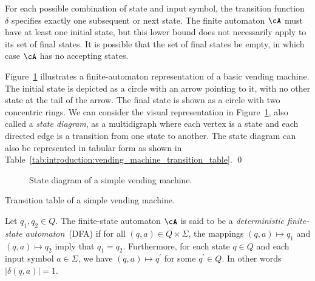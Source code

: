 For each possible combination of state and input symbol, the
transition function $\delta$ specifies exactly one subsequent or next
state. The finite automaton $\cA$ must have at least one initial
state, but this lower bound does not necessarily apply to its set of
final states. It is possible that the set of final states be empty, in
which case $\cA$ has no accepting states.

\begin{example}
\rm
Figure~\ref{fig:introduction:vending_machine_state_diagram}
illustrates a finite-automaton representation of a basic vending
machine. The initial state is depicted as a circle with an arrow
pointing to it, with no other state at the tail of the arrow. The
final state is shown as a circle with two concentric rings. We can
consider the visual representation in
Figure~\ref{fig:introduction:vending_machine_state_diagram}, also
called a \emph{state diagram}, as a
multidigraph where each vertex is a state and each
directed edge is a transition from one state to another. The state
diagram can also be represented in tabular form as shown in
Table~\ref{tab:introduction:vending_machine_transition_table}. \qed
\end{example}

\begin{figure}[!htbp]
\centering
{}

\caption{State diagram of a simple vending machine.}
\label{fig:introduction:vending_machine_state_diagram}
\end{figure}

\begin{table}
\centering
{}

\caption{Transition table of a simple vending machine.}
\label{tab:introduction:vending_machine_transition_table}
\end{table}

Let $q_1, q_2 \in Q$. The finite-state automaton $\cA$ is said to be a
\emph{deterministic finite-state automaton}~(DFA)
if for all
$(q,a) \in Q \times \Sigma$, the mappings $(q,a) \mapsto q_1$ and
$(q,a) \mapsto q_2$ imply that $q_1 = q_2$. Furthermore, for each
state $q \in Q$ and each input symbol $a \in \Sigma$, we have
$(q,a) \mapsto q^\prime$ for some $q^\prime \in Q$. In other words
$|\delta(q,a)| = 1$.

